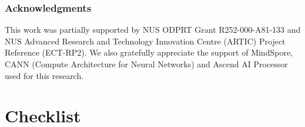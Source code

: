 \documentclass{article}
\begin{document}
\clearpage
\subsubsection*{Acknowledgments}
This work was partially supported by  NUS ODPRT Grant R252-000-A81-133 and NUS Advanced Research and Technology Innovation Centre (ARTIC) Project Reference (ECT-RP2).  We also gratefully appreciate the support of MindSpore, CANN (Compute Architecture for Neural Networks) and Ascend AI Processor used for this research.

{  


}  
 
\clearpage 
\section*{Checklist}

 
\end{document}

